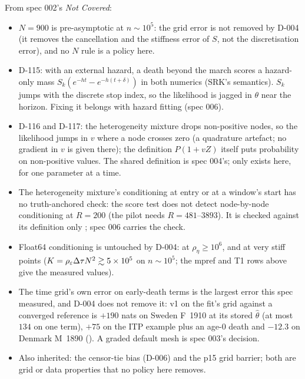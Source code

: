 From spec 002's \emph{Not Covered}:
\begin{itemize}[nosep]
  \item $N=900$ is pre-asymptotic at $n\sim10^5$: the grid error is not removed by D-004 (it removes the cancellation and the stiffness error of $S$, not the
    discretisation error), and no $N$ rule is a policy here.
  \item D-115: with an external hazard, a death beyond the march scores a hazard-only mass $S_k(e^{-h t}-e^{-h(t+\delta)})$ in both numerics (SRK's semantics). $S_k$ jumps with
    the discrete stop index, so the likelihood is jagged in $\theta$ near the horizon. Fixing it belongs with hazard fitting (spec 006).
  \item D-116 and D-117: the heterogeneity mixture drops non-positive nodes, so the likelihood jumps in $v$ where a node crosses zero (a quadrature
    artefact; no gradient in $v$ is given there); the definition $P(1+vZ)$ itself puts probability on non-positive values. The shared definition is spec 004's; only
     exists here, for one parameter at a time.
  \item The heterogeneity mixture's conditioning at entry or at a window's start has no truth-anchored check: the score test does not detect node-by-node conditioning at $R=200$ (the pilot needs $R=481$--$3893$). It is checked against its definition only ; spec 006 carries the check.
  \item Float64 conditioning is untouched by D-004: at $\rho_\eta\ge10^6$, and at very stiff points ($K=\rho_\varepsilon\Delta\tau N^2\gtrsim5\times10^5$ on $n\sim10^5$; the mpref and T1 rows above give the measured values).
  \item The time grid's own error on early-death terms is the largest error this spec measured, and D-004 does not remove it: v1 on the fit's grid against a converged reference is $+190$ nats on Sweden F~1910 at its stored $\hat\theta$ (at most $134$ on one term), $+75$ on the ITP example plus an age-0 death and $-12.3$ on Denmark M~1890 (). A graded default mesh is spec 003's decision.
  \item Also inherited: the censor-tie bias (D-006) and the p15 grid barrier; both are grid or data properties that no policy here removes.
\end{itemize}
